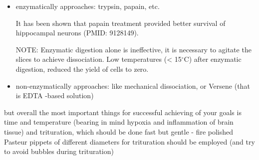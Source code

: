 \begin{itemize}
\label{sec:enzymatic-treatment-technique-dissociate-cells}

  \item enzymatically approaches: trypsin, papain, etc.

It has been shown that papain treatment provided better survival of hippocampal
neurons (PMID: 9128149).

NOTE: Enzymatic digestion alone is ineffective, it is necessary to agitate the
slices to achieve dissociation. Low temperatures (< 15$^\circ$C) after enzymatic
digestion, reduced the yield of cells to zero.

  \item non-enzymatically approaches: like mechanical dissociation, or Versene
  (that is EDTA -based solution)
\end{itemize}
but overall the most important things for successful achieving of your goals is
time and temperature (bearing in mind hypoxia and inflammation of brain tissue)
and trituration, which should be done fast but gentle - fire polished Pasteur
pippets of different diameters for trituration should be employed (and try to
avoid bubbles during trituration)



